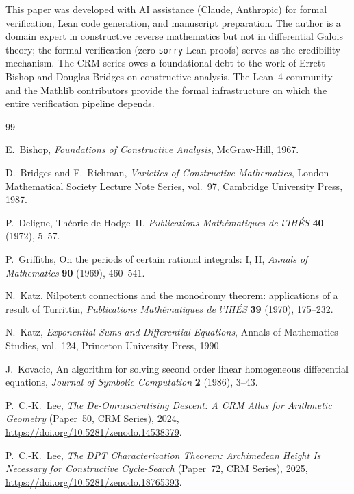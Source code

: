 \documentclass[11pt]{article}
\theoremstyle{plain}
\theoremstyle{definition}
\theoremstyle{remark}
\begin{document}
This paper was developed with AI assistance (Claude, Anthropic) for formal verification, Lean code generation, and manuscript preparation.
The author is a domain expert in constructive reverse mathematics but not in differential Galois theory; the formal verification (zero \texttt{sorry} Lean proofs) serves as the credibility mechanism.
The CRM series owes a foundational debt to the work of Errett Bishop and Douglas Bridges on constructive analysis.
The Lean~4 community and the Mathlib contributors provide the formal infrastructure on which the entire verification pipeline depends.


\begin{thebibliography}{99}

E.~Bishop, \emph{Foundations of Constructive Analysis}, McGraw-Hill, 1967.

D.~Bridges and F.~Richman, \emph{Varieties of Constructive Mathematics},
London Mathematical Society Lecture Note Series, vol.~97, Cambridge University Press, 1987.

P.~Deligne, Th\'eorie de Hodge~II, \emph{Publications Math\'ematiques de l'IH\'ES} \textbf{40} (1972), 5--57.

P.~Griffiths, On the periods of certain rational integrals: I, II,
\emph{Annals of Mathematics} \textbf{90} (1969), 460--541.

N.~Katz, Nilpotent connections and the monodromy theorem: applications of a result of Turrittin,
\emph{Publications Math\'ematiques de l'IH\'ES} \textbf{39} (1970), 175--232.

N.~Katz, \emph{Exponential Sums and Differential Equations},
Annals of Mathematics Studies, vol.~124, Princeton University Press, 1990.

J.~Kovacic, An algorithm for solving second order linear homogeneous differential equations,
\emph{Journal of Symbolic Computation} \textbf{2} (1986), 3--43.

P.~C.-K.~Lee, \emph{The De-Omniscientising Descent: A CRM Atlas for Arithmetic Geometry}
(Paper~50, CRM Series), 2024, \url{https://doi.org/10.5281/zenodo.14538379}.

P.~C.-K.~Lee, \emph{The DPT Characterization Theorem: Archimedean Height Is Necessary for Constructive Cycle-Search}
(Paper~72, CRM Series), 2025, \url{https://doi.org/10.5281/zenodo.18765393}.


\end{thebibliography}
\end{document}
